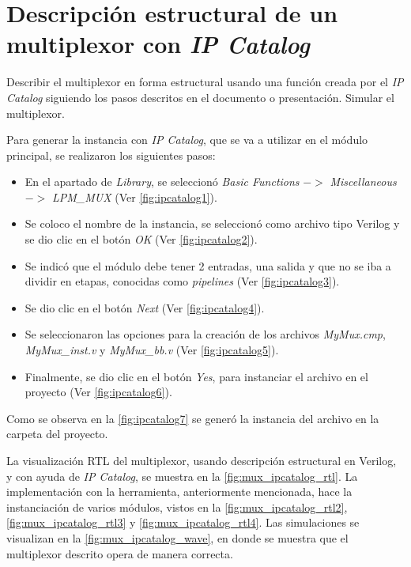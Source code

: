 \section{Descripción estructural de un multiplexor con \textit{IP Catalog} \label{sec:s2}}

\begin{center}
	\begin{minipage}{12cm}
		\begin{tcolorbox}[title=Actividad 2]
			Describir el multiplexor en forma estructural usando una función creada por el \textit{IP Catalog} siguiendo los pasos descritos en el documento o presentación. Simular el multiplexor.
		\end{tcolorbox}	
	\end{minipage}
\end{center}

Para generar la instancia con \textit{IP Catalog}, que se va a utilizar en el módulo principal, se realizaron los siguientes pasos:

\begin{itemize}
	\item En el apartado de \textit{Library}, se seleccionó \textit{Basic Functions} $->$ \textit{Miscellaneous} $->$ \textit{LPM\_MUX} (Ver \autoref{fig:ipcatalog1}).
	\item Se coloco el nombre de la instancia, se seleccionó como archivo tipo Verilog y se dio clic en el botón \textit{OK} (Ver \autoref{fig:ipcatalog2}).
	\item Se indicó que el módulo debe tener 2 entradas, una salida y que no se iba a dividir en etapas, conocidas como \textit{pipelines} (Ver \autoref{fig:ipcatalog3}).
	\item Se dio clic en el botón \textit{Next} (Ver \autoref{fig:ipcatalog4}).
	\item Se seleccionaron las opciones para la creación de los archivos \textit{MyMux.cmp}, \textit{MyMux\_inst.v} y \textit{MyMux\_bb.v} (Ver \autoref{fig:ipcatalog5}).
	\item Finalmente, se dio clic en el botón \textit{Yes}, para instanciar el archivo en el proyecto (Ver \autoref{fig:ipcatalog6}).
\end{itemize}

Como se observa en la \autoref{fig:ipcatalog7} se generó la instancia del archivo en la carpeta del proyecto.

La visualización RTL del multiplexor, usando descripción estructural en Verilog, y con ayuda de \textit{IP Catalog}, se muestra en la \autoref{fig:mux_ipcatalog_rtl}. La implementación con la herramienta, anteriormente mencionada, hace la instanciación de varios módulos, vistos en la \autoref{fig:mux_ipcatalog_rtl2}, \autoref{fig:mux_ipcatalog_rtl3} y \autoref{fig:mux_ipcatalog_rtl4}. Las simulaciones se visualizan en la \autoref{fig:mux_ipcatalog_wave}, en donde se muestra que el multiplexor descrito opera de manera correcta.

